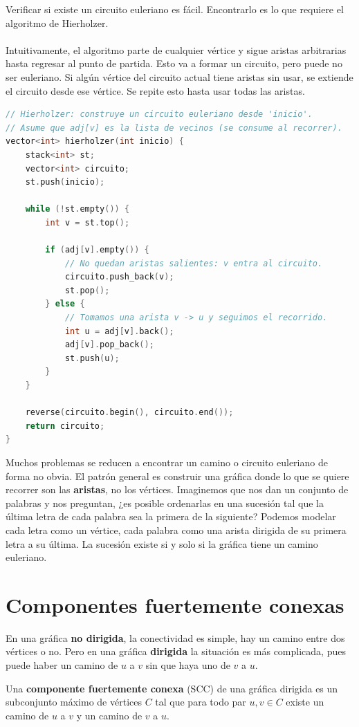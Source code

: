 Verificar si existe un circuito euleriano es fácil. Encontrarlo es lo que requiere el algoritmo de Hierholzer.
\\\\
Intuitivamente, el algoritmo parte de cualquier vértice y sigue aristas arbitrarias hasta regresar al punto de partida. Esto va a formar un circuito, pero puede no ser euleriano. Si algún vértice del circuito actual tiene aristas sin usar, se extiende el circuito
desde ese vértice. Se repite esto hasta usar todas las aristas.
 
\begin{lstlisting}[language=C++]
// Hierholzer: construye un circuito euleriano desde 'inicio'.
// Asume que adj[v] es la lista de vecinos (se consume al recorrer).
vector<int> hierholzer(int inicio) {
    stack<int> st;
    vector<int> circuito;
    st.push(inicio);

    while (!st.empty()) {
        int v = st.top();

        if (adj[v].empty()) {
            // No quedan aristas salientes: v entra al circuito.
            circuito.push_back(v);
            st.pop();
        } else {
            // Tomamos una arista v -> u y seguimos el recorrido.
            int u = adj[v].back();
            adj[v].pop_back();
            st.push(u);
        }
    }

    reverse(circuito.begin(), circuito.end());
    return circuito;
}
\end{lstlisting}
Muchos problemas se reducen a encontrar un camino o circuito euleriano
de forma no obvia. El patrón general es construir una gráfica donde lo
que se quiere recorrer son las \textbf{aristas}, no los vértices. Imaginemos que nos dan un conjunto de palabras y nos preguntan, ¿es posible ordenarlas en una sucesión tal que la última letra de cada palabra sea la primera de la siguiente? Podemos modelar cada letra como un vértice, cada palabra como una arista dirigida de su primera letra a su última. La
sucesión existe si y solo si la gráfica tiene un camino euleriano.
\section{Componentes fuertemente conexas}
En una gráfica \textbf{no dirigida}, la conectividad es simple, hay un
camino entre dos vértices o no. Pero en una gráfica \textbf{dirigida} la
situación es más complicada, pues puede haber un camino de $u$ a $v$ sin que
haya uno de $v$ a $u$.
 
\begin{definition}
Una \textbf{componente fuertemente conexa} (SCC) de una gráfica dirigida
es un subconjunto máximo de vértices $C$ tal que para todo par
$u, v \in C$ existe un camino de $u$ a $v$ y un camino de $v$ a $u$.
\end{definition}
